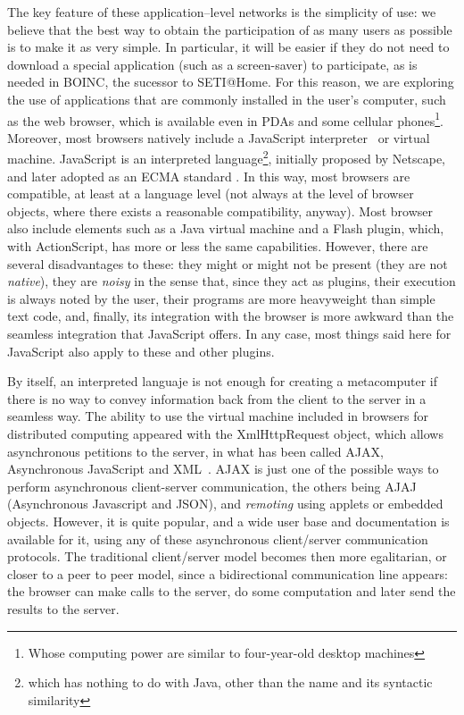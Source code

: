 \documentclass{llncs}
\begin{document}
The key feature of these application--level networks is the simplicity
of use: we believe that the best way to obtain the participation of as
many users as possible is to make it as very simple. In particular, it
will be easier if they do not need to download a special application
(such as a screen-saver) to participate, as is needed in BOINC, the
sucessor to SETI@Home. For this reason, we are exploring the use of
applications that are commonly installed in the user's computer, such
as the web browser, which is available even in PDAs and some cellular
phones\footnote{Whose computing power are similar to four-year-old
desktop machines}.  Moreover, most browsers natively include a
JavaScript
interpreter~\cite{js:reference} or
virtual machine. JavaScript is an interpreted language\footnote{which
has nothing to do with Java, other than the name and its syntactic
similarity}, initially proposed by Netscape, and later adopted as an
ECMA standard \cite{ECMA-262}.  In this
way, most browsers are compatible, at least at a language level (not
always at the level of browser objects, where there exists a
reasonable compatibility, anyway). Most browser also include elements
such as a Java virtual machine and a Flash plugin, which, with
ActionScript, has more or less the same capabilities. However, there
are several disadvantages to these: they might or might not be present
(they are not {\em native}), they are {\em noisy} in the sense that,
since they act as plugins, their execution is always noted by the
user, their programs are more heavyweight than simple text code, and,
finally, its integration with the browser is more awkward than the
seamless integration that JavaScript offers. In any case, most things
said here for JavaScript also apply to these and other plugins.

By itself, an interpreted languaje is not enough for creating a
metacomputer if there is no way to convey information back from the
client to the server in a seamless way. The ability to use the virtual
machine included in browsers for distributed computing appeared with
the {\sf XmlHttpRequest} object, which allows asynchronous petitions to the
server, in what has been called AJAX, Asynchronous JavaScript and
XML~\cite{wiki:AJAX}. AJAX is just one of the possible ways to
perform asynchronous client-server communication, the others being
AJAJ (Asynchronous Javascript and JSON), and {\em remoting} using
applets or embedded objects. However, it is quite popular, and a wide
user base and documentation is available for it, using any of these
asynchronous client/server communication protocols. The traditional client/server model becomes then
more egalitarian, or closer to a peer to peer model, since a
bidirectional communication line appears: the browser can make calls to the
server, do some computation and later send the results to the server.
\end{document}
